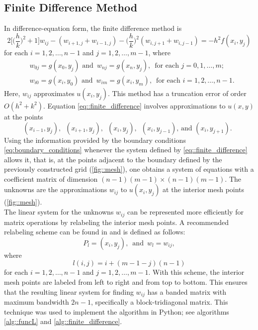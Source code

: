 \documentclass[a4paper]{article}
\begin{document}
\subsection{Finite Difference Method}
In difference-equation form, the finite difference method is
\begin{equation}\label{eq::finite_difference}
2\Bigg[\Bigg(\frac{h}{k}\Bigg)^2 +1  \Bigg]w_{ij}-(w_{i+1,j}+w_{i-1,j})-\Bigg(\frac{h}{k}\Bigg)^2(w_{i,j+1}+w_{i,j-1})=-h^2 f(x_i,y_j)
\end{equation}
for each $i=1,2,\hdots,n-1$ and $j=1,2,\hdots,m-1$, where
\begin{equation}\label{eq:boundary_conditions}
\begin{aligned}
&w_{0j}=g(x_0,y_j)\,\,\text{and }\, w_{nj}=g(x_n,y_j),\,\,\, \text{for each } j=0,1,\hdots,m;\\
&w_{i0}=g(x_i,y_0)\,\,\text{and }\, w_{im}=g(x_i,y_m),\,\,\, \text{for each } i=1,2,\hdots,n-1.
\end{aligned}
\end{equation}
Here, $w_{ij}$ approximates $u(x_i,y_j)$. This method has a truncation error of order $O(h^2+k^2)$. Equation \ref{eq::finite_difference} involves approximations to $u(x,y)$ at the points
\begin{equation*}
(x_{i-1},y_{j}),\,\,\,(x_{i+1},y_{j}),\,\,\,(x_{i},y_{j}),\,\,\,(x_{i},y_{j-1}),\,\text{and}\,\,(x_{i},y_{j+1}).\,\,\,
\end{equation*}
Using the information provided by the boundary conditions \ref{eq:boundary_conditions} whenever the system defined by \ref{eq::finite_difference} allows it, that is, at the points adjacent to the boundary defined by the previously constructed grid (\ref{fig::mesh}), one obtains a system of equations with a coefficient matrix of dimension $(n-1)(m-1)\times(n-1)(m-1)$. The unknowns are the approximations $w_{ij}$ to $u(x_i,y_j)$ at the interior mesh points (\ref{fig::mesh}).\\

The linear system for the unknowns $w_{ij}$ can be represented more efficiently for matrix operations by relabeling the interior mesh points. A recommended relabeling scheme can be found in \cite{Varga} and is defined as follows:
\begin{equation}
P_l=(x_i,y_j), \,\,\, \text{and}\,\,\, w_l=w_{ij},
\end{equation}
where
\begin{equation}\label{eq::relabeling_function}
l(i,j)=i+(m-1-j)(n-1)
\end{equation} 
for each $i=1,2,\hdots,n-1$ and $j=1,2,\hdots,m-1$. With this scheme, the interior mesh points are labeled from left to right and from top to bottom. This ensures that the resulting linear system for finding $w_{ij}$ has a banded matrix with maximum bandwidth $2n-1$, specifically a block-tridiagonal matrix. This technique was used to implement the algorithm in Python; see algorithms \ref{alg::funcL} and \ref{alg::finite_difference}.
\end{document}
